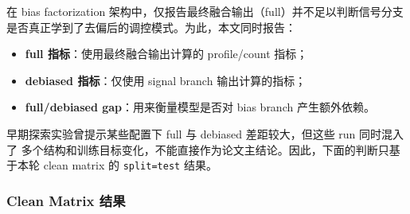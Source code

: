 \documentclass[11pt,a4paper]{ctexart}
\begin{document}
在 bias factorization 架构中，仅报告最终融合输出（full）并不足以判断信号分支
是否真正学到了去偏后的调控模式。为此，本文同时报告：

\begin{itemize}[leftmargin=2em]
  \item \textbf{full 指标}：使用最终融合输出计算的 profile/count 指标；
  \item \textbf{debiased 指标}：仅使用 signal branch 输出计算的指标；
  \item \textbf{full/debiased gap}：用来衡量模型是否对 bias branch 产生额外依赖。
\end{itemize}

早期探索实验曾提示某些配置下 full 与 debiased 差距较大，但这些 run 同时混入了
多个结构和训练目标变化，不能直接作为论文主结论。因此，下面的判断只基于本轮
clean matrix 的 \texttt{split=test} 结果。

\subsubsection{Clean Matrix 结果}

\begin{table}[H]
\centering
\small
\caption{Bias reliance 的 clean revalidation。按本轮预先约定的判读门槛，
A、\texttt{noTF + sg=false + deb2} 和 corrected B 都落在“无实质 shortcut”
区间；C 在两个 seed 上表现为轻度且稳定的 bias reliance，而
\texttt{noTF + sg=true + deb0} 是当前矩阵中唯一达到“明显 shortcut”门槛的
条件。除 C 外，其余各行为单次 held-out test。}
\label{tab:shortcut}
\end{table}
\end{document}
